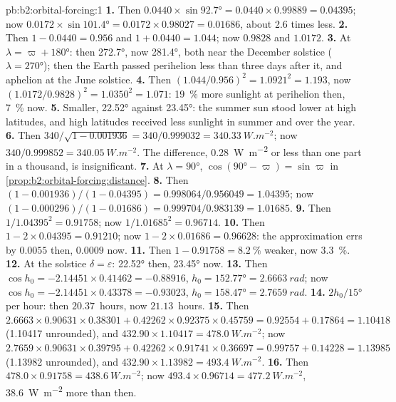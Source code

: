 \begin{solution}{pb:b2:orbital-forcing:1}
\textbf{1.} Then $0.0440 \times \sin\ang{92.7} = 0.0440 \times 0.99889 = 0.04395$; now $0.0172 \times
\sin\ang{101.4} = 0.0172 \times 0.98027 = 0.01686$, about 2.6 times less.
\textbf{2.} Then $1 - 0.0440 = 0.956$ and $1 + 0.0440 = 1.044$; now $0.9828$ and $1.0172$.
\textbf{3.} At $\lambda = \varpi + \ang{180}$: then \ang{272.7}, now \ang{281.4}, both near the
December solstice ($\lambda = \ang{270}$); then the Earth passed perihelion less than three days
after it, and aphelion at the June solstice.
\textbf{4.} Then $(1.044/0.956)^2 = 1.0921^2 = 1.193$, now $(1.0172/0.9828)^2 = 1.0350^2 = 1.071$:
\qty{19}{\percent} more sunlight at perihelion then, \qty{7}{\percent} now.
\textbf{5.} Smaller, \ang{22.52} against \ang{23.45}: the summer sun stood lower at high latitudes,
and high latitudes received less sunlight in summer and over the year.
\textbf{6.} Then $340/\sqrt{1 - 0.001936} = 340/0.999032 = \qty{340.33}{W.m^{-2}}$; now $340/0.999852
= \qty{340.05}{W.m^{-2}}$. The difference, \qty{0.28}{W.m^{-2}} or less than one part in a thousand,
is insignificant.
\textbf{7.} At $\lambda = \ang{90}$, $\cos(\ang{90} - \varpi) = \sin\varpi$ in
\cref{prop:b2:orbital-forcing:distance}.
\textbf{8.} Then $(1 - 0.001936)/(1 - 0.04395) = 0.998064/0.956049 = 1.04395$; now $(1 -
0.000296)/(1 - 0.01686) = 0.999704/0.983139 = 1.01685$.
\textbf{9.} Then $1/1.04395^2 = 0.91758$; now $1/1.01685^2 = 0.96714$.
\textbf{10.} Then $1 - 2 \times 0.04395 = 0.91210$; now $1 - 2 \times 0.01686 = 0.96628$: the
approximation errs by $0.0055$ then, $0.0009$ now.
\textbf{11.} Then $1 - 0.91758 = \qty{8.2}{\percent}$ weaker, now \qty{3.3}{\percent}.
\textbf{12.} At the solstice $\delta = \varepsilon$: \ang{22.52} then, \ang{23.45} now.
\textbf{13.} Then $\cos h_0 = -2.14451 \times 0.41462 = -0.88916$, $h_0 = \ang{152.77} =
\qty{2.6663}{rad}$; now $\cos h_0 = -2.14451 \times 0.43378 = -0.93023$, $h_0 = \ang{158.47} =
\qty{2.7659}{rad}$.
\textbf{14.} $2h_0/\ang{15}$ per hour: then $20.37$~hours, now $21.13$~hours.
\textbf{15.} Then $2.6663 \times 0.90631 \times 0.38301 + 0.42262 \times 0.92375 \times 0.45759 =
0.92554 + 0.17864 = 1.10418$ (\num{1.10417} unrounded), and $432.90 \times 1.10417 =
\qty{478.0}{W.m^{-2}}$; now $2.7659 \times 0.90631 \times 0.39795 + 0.42262 \times 0.91741 \times
0.36697 = 0.99757 + 0.14228 = 1.13985$ (\num{1.13982} unrounded), and $432.90 \times 1.13982 = \qty{493.4}{W.m^{-2}}$.
\textbf{16.} Then $478.0 \times 0.91758 = \qty{438.6}{W.m^{-2}}$; now $493.4 \times 0.96714 =
\qty{477.2}{W.m^{-2}}$, \qty{38.6}{W.m^{-2}} more than then.

\end{solution}
